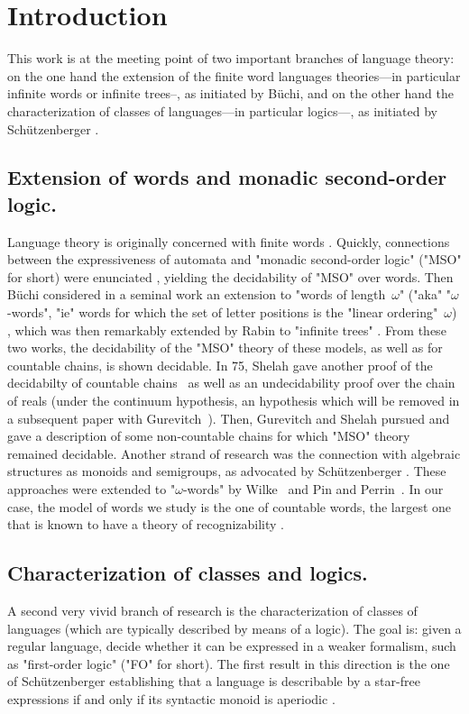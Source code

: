
\section{Introduction}
\label{Introduction}

This work is at the meeting point of two important branches of language theory: on the one hand the extension of the finite word languages theories---in particular infinite words or infinite trees--, as initiated by Büchi, and on the other hand the characterization of classes of languages---in particular logics---, as initiated by Schützenberger \cite{Schutzenberger65}. 

\subsection{Extension of words and monadic second-order logic.}
Language theory is originally concerned with finite words \cite{Kleene56,RabinScott59}. Quickly, connections between the expressiveness of automata and "monadic second-order logic" ("MSO" for short) were enunciated \cite{Trakhtenbrot62,Elgott,Buchi60}, yielding the decidability of "MSO" over words.
Then Büchi considered in a seminal work an extension to "words of length~$\omega$" ("aka" "$\omega$-words", "ie" words for which the set of letter positions is the "linear ordering"~$\omega$) \cite{Buchi62}, which was then remarkably extended by Rabin to "infinite trees" \cite{Rabin69}. From these two works, the decidability of the "MSO" theory of these models, as well as for countable chains, is shown decidable. In 75, Shelah gave another proof of the decidabilty of countable chains~\cite{Shelah75} as well as an undecidability proof over the chain of reals (under the continuum hypothesis, an hypothesis which will be removed in a subsequent paper with Gurevitch~\cite{GurevichShelah79I,GurevichShelah79II}).
Then, Gurevitch and Shelah pursued and gave a description of some non-countable chains for which "MSO" theory remained decidable.
Another strand of research was the connection with algebraic structures as monoids and semigroups, as advocated by Schützenberger \cite{Schutzenberger56semi}. These approaches were extended to "$\omega$-words" by Wilke~\cite{Wilke93a} and 
Pin and Perrin~\cite{PerrinPin04}.
In our case, the model of words we study is the one of countable words, the largest one that is known to have a theory of recognizability \cite{CartonColcombetPuppis}.

\subsection{Characterization of classes and logics.} A second very vivid branch of research is the characterization of classes of languages (which are typically described by means of a logic). The goal is: given a regular language, decide whether it can be expressed in a weaker formalism, such as "first-order logic" ("FO" for short). The first result in this direction is the one of Schützenberger establishing that a language is describable by a star-free expressions if and only if its syntactic monoid is aperiodic \cite{Schutzenberger65}.

